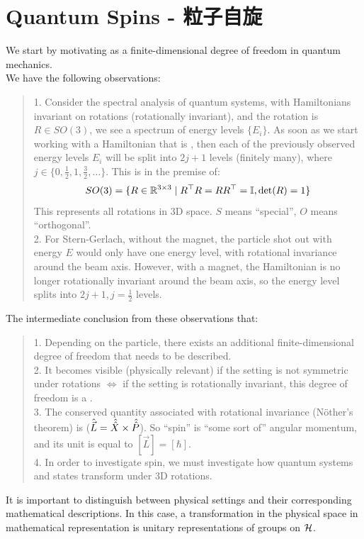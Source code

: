 \section{Quantum Spins - 粒子自旋}
We start by motivating  as a finite-dimensional degree of freedom in quantum mechanics. \\
We have the following observations:
\begin{quote}
    1. Consider the spectral analysis of quantum systems, with Hamiltonians invariant on rotations (rotationally invariant), and the rotation is $R \in SO(3)$, we see a spectrum of energy levels $\{E_i\}$. As soon as we start working with a Hamiltonian that is , then each of the previously observed energy levels $E_i$ will be split into $2j+1$ levels (finitely many), where $j \in \{0, \frac{1}{2}, 1, \frac{3}{2}, \dots\}$. This is in the premise of:
    $$SO(3) = \{R \in \mathbb{R}^{3 \times 3} \mid R^{\top}R = RR^{\top} = \mathbb{I}, \det(R) = 1\}$$
    This represents all rotations in 3D space. $S$ means ``special'', $O$ means ``orthogonal''. \\
    2. For Stern-Gerlach, without the magnet, the particle shot out with energy $E$ would only have one energy level, with rotational invariance around the beam axis. However, with a magnet, the Hamiltonian is no longer rotationally invariant around the beam axis, so the energy level splits into $2j+1, j=\frac{1}{2}$ levels.
\end{quote}
The intermediate conclusion from these observations that:
\begin{quote}
    1. Depending on the particle, there exists an additional finite-dimensional degree of freedom that needs to be described. \\
    2. It becomes visible (physically relevant) if the setting is not symmetric under rotations $\iff$ if the setting is rotationally invariant, this degree of freedom is a . \\
    3. The conserved quantity associated with rotational invariance (N\"other's theorem) is  ($\hat{\vec{L}} = \hat{\hat{X}} \times \hat{\hat{P}}$). So ``spin'' is ``some sort of'' angular momentum, and its unit is equal to $[\vec{L}] = [\hbar]$. \\
    4. In order to investigate spin, we must investigate how quantum systems and states transform under 3D rotations.
\end{quote}
It is important to distinguish between physical settings and their corresponding mathematical descriptions. In this case, a transformation in the physical space in mathematical representation is unitary representations of groups on $\mathcal{H}$.

